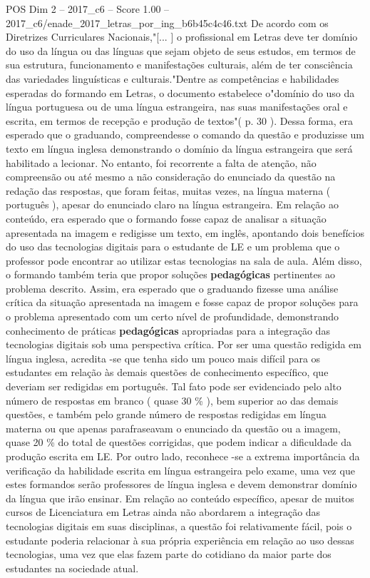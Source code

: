 \begin{textsample}{POS Dim 2 – 2017\_c6 – Score 1.00 – 2017\_c6/enade\_2017\_letras\_por\_ing\_b6b45c4c46.txt}
De acordo com os Diretrizes Curriculares Nacionais,"[... ] o profissional em Letras deve ter domínio do uso da língua ou das línguas que sejam objeto de seus estudos, em termos de sua estrutura, funcionamento e manifestações culturais, além de ter consciência das variedades linguísticas e culturais."Dentre as competências e habilidades esperadas do formando em Letras, o documento estabelece o"domínio do uso da língua portuguesa ou de uma língua estrangeira, nas suas manifestações oral e escrita, em termos de recepção e produção de textos"( p. 30 ).
Dessa forma, era esperado que o graduando, compreendesse o comando da questão e produzisse um texto em língua inglesa demonstrando o domínio da língua estrangeira que será habilitado a lecionar.
No entanto, foi recorrente a falta de atenção, não compreensão ou até mesmo a não consideração do enunciado da questão na redação das respostas, que foram feitas, muitas vezes, na língua materna ( português ), apesar do enunciado claro na língua estrangeira.
Em relação ao conteúdo, era esperado que o formando fosse capaz de analisar a situação apresentada na imagem e redigisse um texto, em inglês, apontando dois benefícios do uso das tecnologias digitais para o estudante de LE e um problema que o professor pode encontrar ao utilizar estas tecnologias na sala de aula.
Além disso, o formando também teria que propor soluções \textbf{pedagógicas} pertinentes ao problema descrito.
Assim, era esperado que o graduando fizesse uma análise crítica da situação apresentada na imagem e fosse capaz de propor soluções para o problema apresentado com um certo nível de profundidade, demonstrando conhecimento de práticas \textbf{pedagógicas} apropriadas para a integração das tecnologias digitais sob uma perspectiva crítica.
Por ser uma questão redigida em língua inglesa, acredita -se que tenha sido um pouco mais difícil para os estudantes em relação às demais questões de conhecimento específico, que deveriam ser redigidas em português.
Tal fato pode ser evidenciado pelo alto número de respostas em branco ( quase 30 \% ), bem superior ao das demais questões, e também pelo grande número de respostas redigidas em língua materna ou que apenas parafraseavam o enunciado da questão ou a imagem, quase 20 \% do total de questões corrigidas, que podem indicar a dificuldade da produção escrita em LE.
Por outro lado, reconhece -se a extrema importância da verificação da habilidade escrita em língua estrangeira pelo exame, uma vez que estes formandos serão professores de língua inglesa e devem demonstrar domínio da língua que irão ensinar.
Em relação ao conteúdo específico, apesar de muitos cursos de Licenciatura em Letras ainda não abordarem a integração das tecnologias digitais em suas disciplinas, a questão foi relativamente fácil, pois o estudante poderia relacionar à sua própria experiência em relação ao uso dessas tecnologias, uma vez que elas fazem parte do cotidiano da maior parte dos estudantes na sociedade atual.

\end{textsample}
